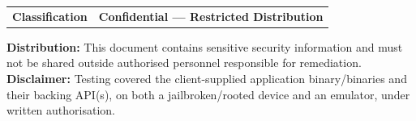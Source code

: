 \begin{titlepage}
\begin{minipage}{13cm}
\begin{tabular}{@{}p{4.2cm}p{8cm}}
    {\color{MedGray}\small\bfseries Classification}       & \vspace{0cm} \small \textbf{Confidential --- Restricted Distribution} \\
  \end{tabular}
\end{minipage}
\vfill
\hspace{2.5cm}\begin{minipage}{13cm}
  \color{TextMain}\small
  \textbf{Distribution:} This document contains sensitive security information and must not be
  shared outside authorised personnel responsible for remediation.\\[6pt]
  \textbf{Disclaimer:} Testing covered the client-supplied application binary/binaries and their
  backing API(s), on both a jailbroken/rooted device and an emulator, under written authorisation.
\end{minipage}
\vspace{1.0cm}
\end{titlepage}

